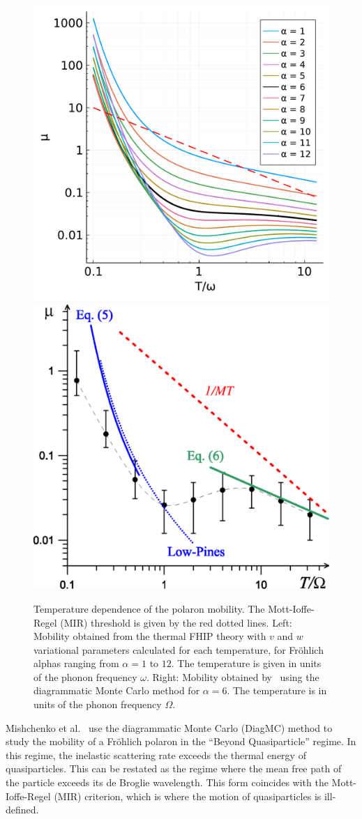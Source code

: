 \begin{figure}[t]
    \centering
    \includegraphics[width=.49\textwidth]{figures/moblility_temp_alpha.pdf}
    \includegraphics[width=.49\textwidth]{figures/medium (1).png}
    
    \caption{Temperature dependence of the polaron mobility. The Mott-Ioffe-Regel (MIR) threshold is given by the red dotted lines. Left: Mobility obtained from the thermal FHIP theory with $v$ and $w$ variational parameters calculated for each temperature, for Fr\"ohlich alphas ranging from $\alpha = 1$ to  $12$. The temperature is given in units of the phonon frequency $\omega$. Right: Mobility obtained by~\cite{mishchenko_polaron_2019} using the diagrammatic Monte Carlo method for $\alpha = 6$. The temperature is in units of the phonon frequency $\Omega$.}
    \label{fig:mishchenko2}
\end{figure}

Mishchenko et al.~\cite{mishchenko_polaron_2019} use the diagrammatic Monte Carlo (DiagMC) method to study the mobility of a Fr\"ohlich polaron in the ``Beyond Quasiparticle'' regime. In this regime, the inelastic scattering rate exceeds the thermal energy of quasiparticles. This can be restated as the regime where the mean free path of the particle exceeds its de Broglie wavelength. This form coincides with the Mott-Ioffe-Regel (MIR) criterion, which is where the motion of quasiparticles is ill-defined. 

